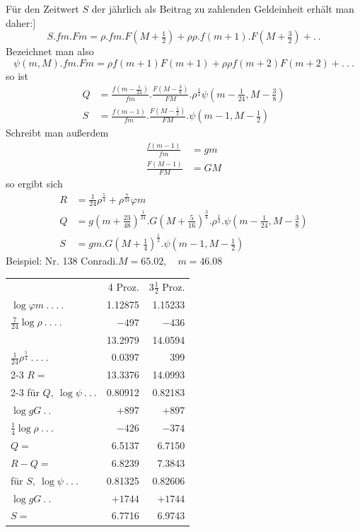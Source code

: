 Für den Zeitwert \(S\) der jährlich als Beitrag zu zahlenden Geldeinheit erhält man daher:]
\[
S\mathord{.}fm\mathord{.}Fm=\rho\mathord{.}fm\mathord{.}F(M+\tfrac{1}{2})+\rho\rho\mathord{.}f(m+1)\mathord{.}F(M+\tfrac{3}{2})+.\ .
\]
\noindent Bezeichnet man also
\[
\psi(m,M)\mathord{.}fm\mathord{.}Fm=\rho f(m+1)F(m+1)+\rho\rho f(m+2)F(m+2)+.\ .\ .
\]
\noindent so ist
\[
\begin{aligned}
Q&=\frac{f(m-\tfrac{1}{24})}{fm}\mathord{.}\frac{F(M-\tfrac{3}{8})}{FM}\mathord{.}\rho^{\frac{1}{4}}\psi(m-\tfrac{1}{24},M-\tfrac{3}{8})\\[5pt]
S&=\frac{f(m-1)}{fm}\mathord{.}\frac{F(M-\tfrac{1}{2})}{FM}\mathord{.}\psi(m-1,M-\tfrac{1}{2})
\end{aligned}
\]
\noindent Schreibt man außerdem
\[
\begin{aligned}
\frac{f(m-1)}{fm}&=gm\\[5pt]
\frac{F(M-1)}{FM}&=GM
\end{aligned}
\]
\noindent so ergibt sich
\[
\begin{aligned}
R&=\tfrac{1}{24}\rho^{\frac{5}{4}}+\rho^{\frac{7}{24}}\varphi m\\
Q&=g(m+\tfrac{23}{48})^{\frac{1}{24}}\mathord{.}G(M+\tfrac{5}{16})^{\frac{3}{8}}\mathord{.}\rho^{\frac{1}{4}}\mathord{.}\psi(m-\tfrac{1}{24},M-\tfrac{3}{8})\\
S&=gm\mathord{.}G(M+\tfrac{1}{4})^{\frac{1}{2}}\mathord{.}\psi(m-1,M-\tfrac{1}{2})
\end{aligned}
\]
Beispiel: Nr. 138 Conradi.\quad \(M=65.02,\quad m=46.08\)
\begin{center}
\fontsize{9}{14}\selectfont\setlength{\tabcolsep}{5pt}
\begin{tabular}{lrr}
&4 Proz.&\(3\tfrac{1}{2}\) Proz.\\
\(\log\varphi m\ .\ .\ .\ .\)&1.12875&1.15233\\
\(\tfrac{7}{24}\log\rho\ .\ .\ .\ .\)&\(-497\)&\(-436\)\\
&13.2979&14.0594\\
\(\tfrac{1}{24}\rho^{\frac{5}{4}}\ .\ .\ .\ .\)&0.0397&399\\\cline{2-3}
\(R=\)&13.3376&14.0993\\\cline{2-3}
für \(Q,\ \log\psi\ .\ .\ .\)&0.80912&0.82183\\
\(\log gG\ .\ .\)&\(+897\)&\(+897\)\\
\(\tfrac{1}{4}\log\rho\ .\ .\ .\)&\(-426\)&\(-374\)\\
\(Q=\)&6.5137&6.7150\\
\(R-Q=\)&6.8239&7.3843\\\hline
für \(S,\ \log\psi\ .\ .\ .\)&0.81325&0.82606\\
\(\log gG\ .\ .\)&\(+1744\)&\(+1744\)\\
\(S=\)&6.7716&6.9743\\\hline
\end{tabular}
\end{center}
